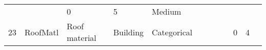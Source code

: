 \documentclass[11pt]{article}
\begin{document}
\begin{longtable}[]{@{}llllllllllll@{}}
\begin{minipage}[t]{0.04\columnwidth}
\strut
\end{minipage} & \begin{minipage}[t]{0.04\columnwidth}\raggedright\strut
\strut
\end{minipage} & \begin{minipage}[t]{0.04\columnwidth}\raggedright\strut
0\strut
\end{minipage} & \begin{minipage}[t]{0.04\columnwidth}\raggedright\strut
5\strut
\end{minipage} & \begin{minipage}[t]{0.04\columnwidth}\raggedright\strut
Medium\strut
\end{minipage}\tabularnewline
\begin{minipage}[t]{0.04\columnwidth}\raggedright\strut
23\strut
\end{minipage} & \begin{minipage}[t]{0.04\columnwidth}\raggedright\strut
RoofMatl\strut
\end{minipage} & \begin{minipage}[t]{0.04\columnwidth}\raggedright\strut
Roof material\strut
\end{minipage} & \begin{minipage}[t]{0.04\columnwidth}\raggedright\strut
Building\strut
\end{minipage} & \begin{minipage}[t]{0.04\columnwidth}\raggedright\strut
Categorical\strut
\end{minipage} & \begin{minipage}[t]{0.04\columnwidth}\raggedright\strut
\strut
\end{minipage} & \begin{minipage}[t]{0.04\columnwidth}\raggedright\strut
\strut
\end{minipage} & \begin{minipage}[t]{0.04\columnwidth}\raggedright\strut
\strut
\end{minipage} & \begin{minipage}[t]{0.04\columnwidth}\raggedright\strut
\strut
\end{minipage} & \begin{minipage}[t]{0.04\columnwidth}\raggedright\strut
0\strut
\end{minipage} & \begin{minipage}[t]{0.04\columnwidth}\raggedright\strut
4\strut
\end{minipage} & \begin{minipage}[t]{0.04\columnwidth}\raggedright\strut

\end{minipage}
\end{longtable}
\end{document}

